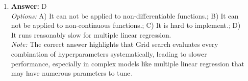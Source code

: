 \documentclass[12pt]{article}
\begin{document}
\begin{enumerate}[label=\arabic*.]
\\ \textit{Note:} The polynomial degree directly influences the model's complexity, with a lower degree leading to underfitting and a higher degree increasing the risk of overfitting, thus affecting the balance between the two.
\item \textbf{Answer:} D
\\ \textit{Options:} A) It can not be applied to non-differentiable functions.; B) It can not be applied to non-continuous functions.; C) It is hard to implement.; D) It runs reasonably slow for multiple linear regression.
\\ \textit{Note:} The correct answer highlights that Grid search evaluates every combination of hyperparameters systematically, leading to slower performance, especially in complex models like multiple linear regression that may have numerous parameters to tune.
\end{enumerate}
\end{document}
